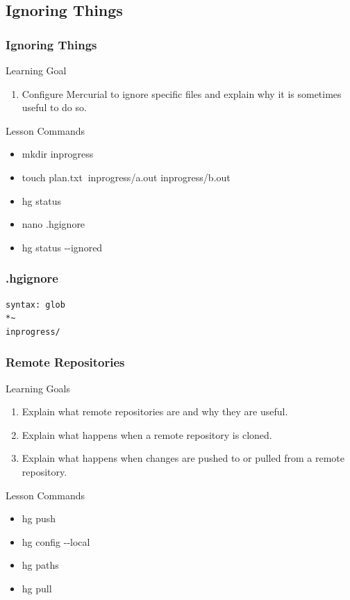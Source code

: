 \documentclass{beamer}
\renewcommand{\dh}{{-}{-}}
\begin{document}
\subsection*{Ignoring Things}
\begin{frame}[label=ignore]
\frametitle{Ignoring Things}
\begin{block}{Learning Goal}
\begin{enumerate}
\item Configure Mercurial to ignore specific files and explain why it is sometimes useful to do so.
\end{enumerate}
\end{block}
\begin{block}{Lesson Commands}
\begin{itemize}
\item mkdir inprogress
\item touch plan.txt$~$ inprogress/a.out inprogress/b.out
\item hg status
\item nano .hgignore
\item hg status \dh ignored
\end{itemize}
\end{block}
\end{frame}

\begin{frame}[fragile]
\frametitle{.hgignore}
\begin{verbatim}
syntax: glob
*~
inprogress/
\end{verbatim}
\end{frame}



\begin{frame}[label=remote-repos]
  \frametitle{Remote Repositories}
  \begin{block}{Learning Goals}
    \begin{enumerate}
      \item Explain what remote repositories are and why they are useful.
      \item Explain what happens when a remote repository is cloned.
      \item Explain what happens when changes are pushed to or pulled from a remote repository.
    \end{enumerate}
  \end{block}
  \begin{block}{Lesson Commands}
    \begin{itemize}
      \item hg push
      \item hg config \dh local
      \item hg paths
      \item hg pull
    \end{itemize}
  \end{block}
\end{frame}
\end{document}

